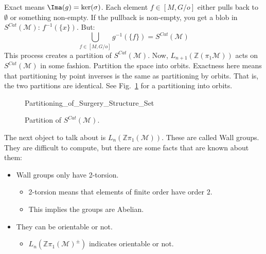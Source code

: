 \documentclass[crop=false,class=book,oneside]{standalone}
\begin{document}
            Exact means $\Ima(g)=\ker(\sigma)$.
            Each element $f\in{[M,G/o]}$
            either pulls back to $\emptyset$ or
            something non-empty. If the pullback is non-empty,
            you get a blob in
            $S^{Cat}(\mathcal{M})$: $f^{-1}(\{x\})$.
            But:
            \begin{equation}
                \bigcup_{f\in[M,G/o]}g^{-1}(\{f\})
                =S^{Cat}(\mathcal{M})
            \end{equation}
            This process creates a partition of
            $S^{Cat}(\mathcal{M})$. Now,
            $L_{n+1}(\mathbb{Z}(\pi_{1}\mathcal{M}))$
            acts on $S^{Cat}(\mathcal{M})$ in some fashion.
            Partition the space into orbits. Exactness
            here means that partitioning by point inverses
            is the same as partitioning by orbits. That is,
            the two partitions are identical. See
            Fig.~\ref{fig:surgery_theory_partition_of_S_Cat}
            for a partitioning into orbits.
            \newpage
            \begin{figure}[H]
                \centering
                \captionsetup{type=figure}
                
                          {Partitioning_of_Surgery_Structure_Set}
                \caption{Partition of $S^{Cat}(\mathcal{M})$.}
                \label{fig:surgery_theory_partition_of_S_Cat}
            \end{figure}
            The next object to talk about is
            $L_{n}(\mathbb{Z}\pi_{1}(\mathcal{M}))$.
            These are called Wall groups.
            They are difficult to compute,
            but there are some facts that are known about them:
            \begin{itemize}
                \item Wall groups only have 2-torsion.
                \begin{itemize}
                    \item 2-torsion means that elements
                          of finite order have order $2$.
                    \item This implies the groups are Abelian.
                \end{itemize}
                \item They can be orientable or not.
                \begin{itemize}
                    \item $L_{n}(%
                           \mathbb{Z}\pi_{1}(\mathcal{M})^{\pm})$
                           indicates orientable or not.
                \end{itemize}
            \end{itemize}
\end{document}
